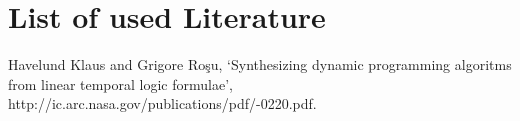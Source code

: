 \chapter[Literature]{List of used Literature}

\begin{list}{}{%
}

    
    \item Havelund Klaus and Grigore Roşu, `Synthesizing dynamic programming
    algoritms from linear temporal logic formulae',
    http://\-ic.arc.nasa.gov/\-publications/\-pdf/-0220.pdf.


\end{list}
